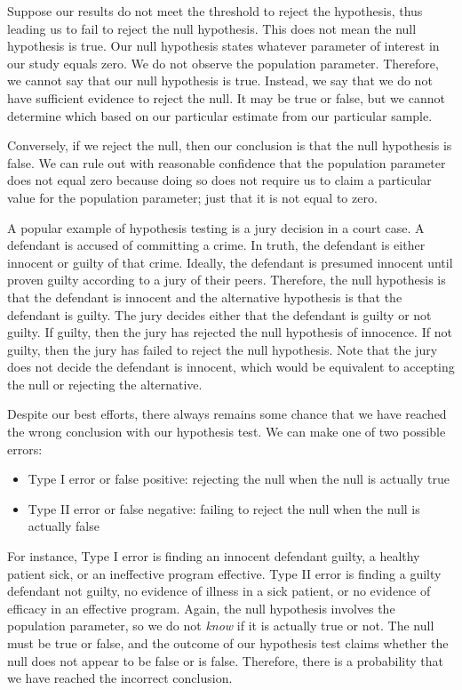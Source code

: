 \documentclass[
]{book}
\providecommand{\tightlist}{%
  \setlength{\itemsep}{0pt}\setlength{\parskip}{0pt}}
\begin{document}
Suppose our results do not meet the threshold to reject the hypothesis, thus leading us to fail to reject the null hypothesis. This does not mean the null hypothesis is true. Our null hypothesis states whatever parameter of interest in our study equals zero. We do not observe the population parameter. Therefore, we cannot say that our null hypothesis is true. Instead, we say that we do not have sufficient evidence to reject the null. It may be true or false, but we cannot determine which based on our particular estimate from our particular sample.

Conversely, if we reject the null, then our conclusion is that the null hypothesis is false. We can rule out with reasonable confidence that the population parameter does not equal zero because doing so does not require us to claim a particular value for the population parameter; just that it is not equal to zero.

A popular example of hypothesis testing is a jury decision in a court case. A defendant is accused of committing a crime. In truth, the defendant is either innocent or guilty of that crime. Ideally, the defendant is presumed innocent until proven guilty according to a jury of their peers. Therefore, the null hypothesis is that the defendant is innocent and the alternative hypothesis is that the defendant is guilty. The jury decides either that the defendant is guilty or not guilty. If guilty, then the jury has rejected the null hypothesis of innocence. If not guilty, then the jury has failed to reject the null hypothesis. Note that the jury does not decide the defendant is innocent, which would be equivalent to accepting the null or rejecting the alternative.

Despite our best efforts, there always remains some chance that we have reached the wrong conclusion with our hypothesis test. We can make one of two possible errors:

\begin{itemize}
\tightlist
\item
  Type I error or false positive: rejecting the null when the null is actually true
\item
  Type II error or false negative: failing to reject the null when the null is actually false
\end{itemize}

For instance, Type I error is finding an innocent defendant guilty, a healthy patient sick, or an ineffective program effective. Type II error is finding a guilty defendant not guilty, no evidence of illness in a sick patient, or no evidence of efficacy in an effective program. Again, the null hypothesis involves the population parameter, so we do not \emph{know} if it is actually true or not. The null must be true or false, and the outcome of our hypothesis test claims whether the null does not appear to be false or is false. Therefore, there is a probability that we have reached the incorrect conclusion.
\end{document}
